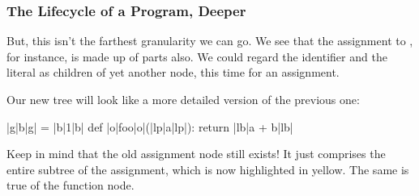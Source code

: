 \documentclass[aspectratio=169, handout]{beamer}
\begin{document}
\begin{frame}[fragile]
  \frametitle{The Lifecycle of a Program, Deeper}

  But, this isn't the farthest granularity we can go. We see that the assignment to
  , for instance, is made up of parts also. We could regard the identifier
   and the literal  as children of yet another node, this time for
  an assignment.

  \pause
  \vspace{5pt}

  Our new tree will look like a more detailed version of the previous one:

  \vspace{8pt}

  \begin{minipage}[t][1.4in][t]{\textwidth}
    \begin{minipage}{0.3\textwidth}
      \begin{pythoncodeblock}
        |g|b|g| = |b|1|b|
        def |o|foo|o|(|lp|a|lp|):
          return |lb|a + b|lb|
      \end{pythoncodeblock}
    \end{minipage}
    \begin{minipage}{0.65\textwidth}
      \begin{center}
      \end{center}
    \end{minipage}
  \end{minipage}

  \pause
  \vspace{8pt}

  Keep in mind that the old assignment node still exists! It just comprises the entire
  subtree of the assignment, which is now highlighted in yellow. The same is true of the
  function node.
\end{frame}
\end{document}
